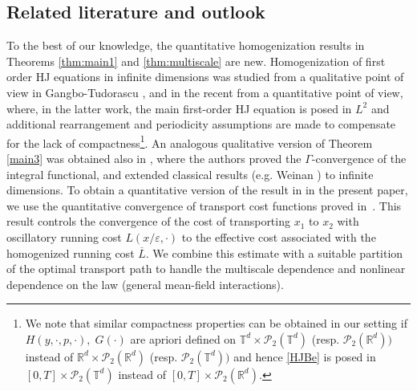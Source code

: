\documentclass[reqno,11pt]{amsart}
\numberwithin{equation}{section}
\newcommand{\R}{\mathbb{R}} %
\newcommand{\e}{\varepsilon}
\newcommand{\ep}{\varepsilon}
\newcommand{\T}{\mathbb{T}}
\begin{document}


\subsection{Related literature and outlook}
To the best of our knowledge, the quantitative homogenization results in Theorems \ref{thm:main1} and \ref{thm:multiscale} are new. Homogenization of first order HJ equations in infinite dimensions was studied from a qualitative point of view in Gangbo-Tudorascu \cite[Section 3.3]{GangboTudorascu2012}, and in the recent \cite{park2026periodic} from a quantitative point of view, where, in the latter work, the main first-order HJ equation is posed in $L^2$ and additional rearrangement and periodicity assumptions are made to compensate for the lack of compactness\footnote{We note that similar compactness properties can be obtained in our setting if $H(y,\cdot,p,\cdot),\; G(\cdot)$ are apriori defined on $\T^d\times\mathcal{P}_2(\T^d)$ (resp. $\mathcal{P}_2(\R^d))$ instead of $\R^d\times \mathcal{P}_2(\R^d)$ (resp. $\mathcal{P}_2(\T^d))$ and hence \eqref{HJBe} is posed in $[0,T]\times\mathcal{P}_2(\T^d)$ instead of $[0,T]\times\mathcal{P}_2(\R^d)$.}.
An analogous qualitative version of Theorem \ref{main3} was obtained also in \cite{GangboTudorascu2012}, where the authors proved the $\Gamma$-convergence of the integral functional, and extended classical results (e.g. Weinan \cite[Section 7]{Weinan1991})  to infinite dimensions. To obtain a quantitative version of the result in \cite{GangboTudorascu2012} in the present paper, we use the quantitative convergence of transport cost functions proved in~\cite{TranYu2021}. This result controls the convergence of the cost of transporting $x_1$ to $x_2$ with oscillatory running cost $L(x/\e,\cdot)$ to the effective cost associated with the homogenized running cost $\overline{L}$. We combine this estimate with a suitable partition of the optimal transport path to handle the multiscale dependence and nonlinear dependence on the law (general mean-field interactions).
\end{document}
